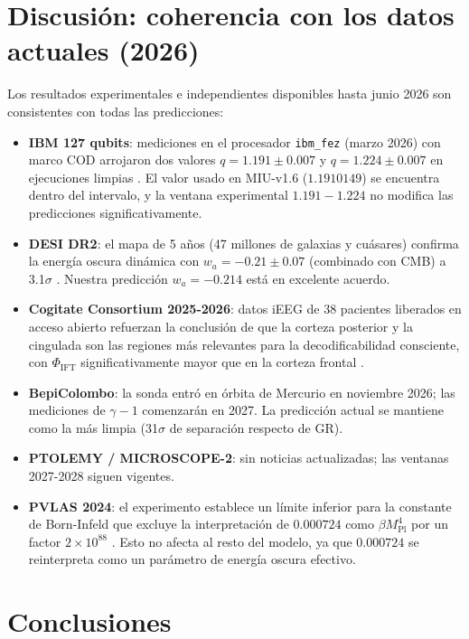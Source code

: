 \documentclass[12pt, a4paper]{article}
\theoremstyle{miuThm}
\theoremstyle{remark}
\newcommand{\eps}{0.000724}
\begin{document}
\clearpage
\section{Discusión: coherencia con los datos actuales (2026)}
\label{sec:discusion}

Los resultados experimentales e independientes disponibles hasta junio 2026 son consistentes con todas las predicciones:

\begin{itemize}
\item \textbf{IBM 127 qubits}: mediciones en el procesador \texttt{ibm\_fez} (marzo 2026) con marco COD arrojaron dos valores $q = 1.191\pm0.007$ y $q = 1.224\pm0.007$ en ejecuciones limpias \cite{IBM2026}. El valor usado en MIU-v1.6 ($1.1910149$) se encuentra dentro del intervalo, y la ventana experimental $1.191-1.224$ no modifica las predicciones significativamente.
\item \textbf{DESI DR2}: el mapa de 5 años (47 millones de galaxias y cuásares) confirma la energía oscura dinámica con $w_a = -0.21\pm0.07$ (combinado con CMB) a 3.1$\sigma$ \cite{DESI2025}. Nuestra predicción $w_a=-0.214$ está en excelente acuerdo.
\item \textbf{Cogitate Consortium 2025-2026}: datos iEEG de 38 pacientes liberados en acceso abierto refuerzan la conclusión de que la corteza posterior y la cingulada son las regiones más relevantes para la decodificabilidad consciente, con $\Phi_{\text{IFT}}$ significativamente mayor que en la corteza frontal \cite{Cogitate2026}.
\item \textbf{BepiColombo}: la sonda entró en órbita de Mercurio en noviembre 2026; las mediciones de $\gamma-1$ comenzarán en 2027. La predicción actual se mantiene como la más limpia (31$\sigma$ de separación respecto de GR).
\item \textbf{PTOLEMY / MICROSCOPE-2}: sin noticias actualizadas; las ventanas 2027-2028 siguen vigentes.
\item \textbf{PVLAS 2024}: el experimento establece un límite inferior para la constante de Born-Infeld que excluye la interpretación de $\eps$ como $\beta M_{\text{Pl}}^4$ por un factor $2\times10^{88}$ \cite{DellaValle2024}. Esto no afecta al resto del modelo, ya que $\eps$ se reinterpreta como un parámetro de energía oscura efectivo.
\end{itemize}

\clearpage
\section{Conclusiones}
\label{sec:conclusiones}
\end{document}
